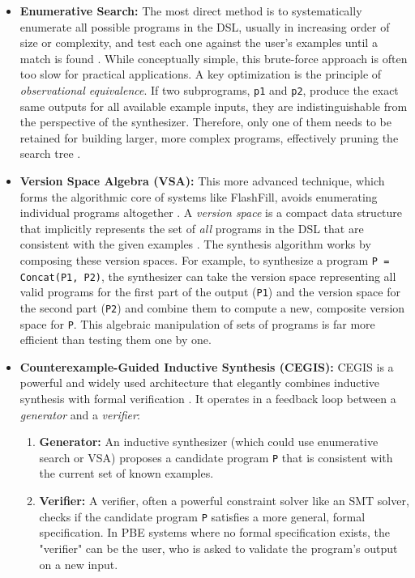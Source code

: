\documentclass[12pt, a4paper]{report}
\begin{document}
\begin{itemize}
    \item \textbf{Enumerative Search:} The most direct method is to systematically enumerate all possible programs in the DSL, usually in increasing order of size or complexity, and test each one against the user's examples until a match is found \citep{alur2013syntax}. While conceptually simple, this brute-force approach is often too slow for practical applications. A key optimization is the principle of \textit{observational equivalence}. If two subprograms, \texttt{p1} and \texttt{p2}, produce the exact same outputs for all available example inputs, they are indistinguishable from the perspective of the synthesizer. Therefore, only one of them needs to be retained for building larger, more complex programs, effectively pruning the search tree \citep{udupa2013transit}.
    \item \textbf{Version Space Algebra (VSA):} This more advanced technique, which forms the algorithmic core of systems like FlashFill, avoids enumerating individual programs altogether \citep{gulwani2011automating}. A \textit{version space} is a compact data structure that implicitly represents the set of \textit{all} programs in the DSL that are consistent with the given examples \citep{lau2003programming}. The synthesis algorithm works by composing these version spaces. For example, to synthesize a program \texttt{P = Concat(P1, P2)}, the synthesizer can take the version space representing all valid programs for the first part of the output (\texttt{P1}) and the version space for the second part (\texttt{P2}) and combine them to compute a new, composite version space for \texttt{P}. This algebraic manipulation of sets of programs is far more efficient than testing them one by one.
    \item \textbf{Counterexample-Guided Inductive Synthesis (CEGIS):} CEGIS is a powerful and widely used architecture that elegantly combines inductive synthesis with formal verification \citep{solar2008sketch}. It operates in a feedback loop between a \textit{generator} and a \textit{verifier}:
    \begin{enumerate}
        \item \textbf{Generator:} An inductive synthesizer (which could use enumerative search or VSA) proposes a candidate program \texttt{P} that is consistent with the current set of known examples.
        \item \textbf{Verifier:} A verifier, often a powerful constraint solver like an SMT solver, checks if the candidate program \texttt{P} satisfies a more general, formal specification. In PBE systems where no formal specification exists, the "verifier" can be the user, who is asked to validate the program's output on a new input.

\end{enumerate}
\end{itemize}
\end{document}

